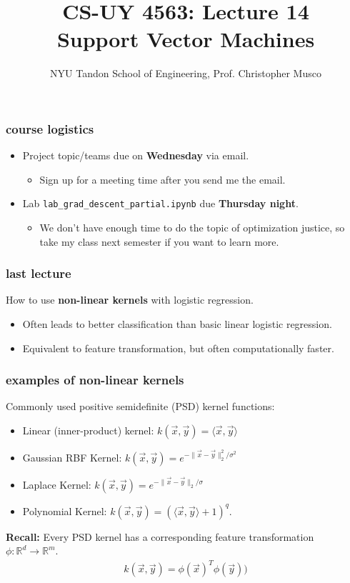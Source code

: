 \documentclass[handout,compress]{beamer}
\title{CS-UY 4563: Lecture 14 \\ Support Vector Machines}
\author{NYU Tandon School of Engineering, Prof. Christopher Musco}
\date{}
\newcommand{\R}{\mathbb{R}}
\begin{document}
\begin{frame}
	\titlepage 
\end{frame}


\begin{frame}
	\frametitle{course logistics}
	\begin{itemize}
		\item Project topic/teams due on \textbf{Wednesday} via email.
		\begin{itemize}
			\item Sign up for a meeting time after you send me the email.
		\end{itemize}
		\item Lab \texttt{lab\_grad\_descent\_partial.ipynb} due \textbf{Thursday night}.
		\begin{itemize}
			\item  We don't have enough time to do the topic of optimization justice, so take my class next semester if you want to learn more. 
		\end{itemize}
	\end{itemize}
	
\end{frame}

\begin{frame}
	\frametitle{last lecture}
	\begin{center}
	How to use \textbf{\alert{non-linear kernels}} with logistic regression. 
\end{center}
\begin{itemize}
	\item Often leads to better classification than basic linear logistic regression.
	\item Equivalent to feature transformation, but often computationally faster.
\end{itemize}
\end{frame}

\begin{frame} 
	\frametitle{examples of non-linear kernels}
	Commonly used positive semidefinite (PSD) kernel functions:
	\begin{itemize}
		\item Linear (inner-product) kernel: $k(\vec{x}, \vec{y}) = \langle \vec{x},\vec{y}\rangle$
		\item Gaussian RBF Kernel: $k(\vec{x}, \vec{y}) = e^{-\|\vec{x} - \vec{y}\|_2^2/\sigma^2}$
		\item Laplace Kernel: $k(\vec{x}, \vec{y}) = e^{-\|\vec{x} - \vec{y}\|_2/\sigma}$
		\item Polynomial Kernel: $k(\vec{x}, \vec{y}) = (\langle \vec{x},\vec{y}\rangle + 1)^q$.
	\end{itemize}
	\textbf{Recall:} Every PSD kernel has a corresponding feature transformation $\phi: \R^d \rightarrow \R^m$.
	\begin{align*}
		k(\vec{x}, \vec{y}) = \phi(\vec{x})^T\phi(\vec{y})) 
	\end{align*}
\end{frame}
\end{document}

